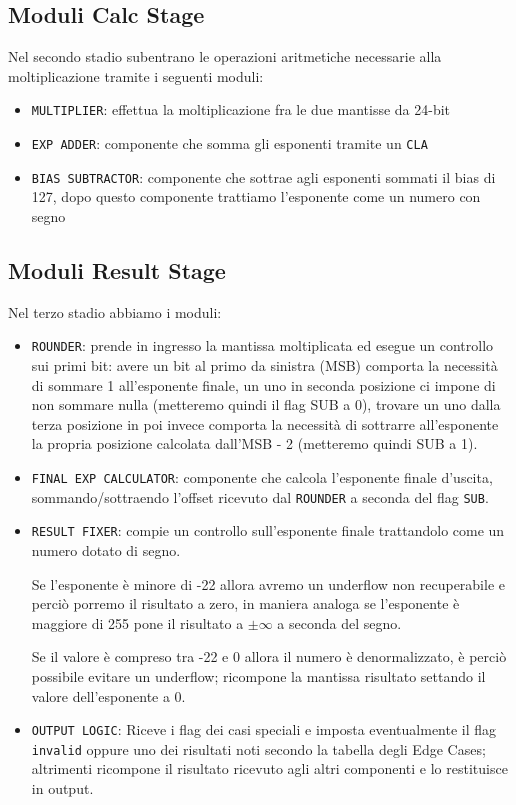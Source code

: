 \documentclass[twoside,11pt]{article}
\begin{document}
{\subsection{Moduli Calc Stage}
Nel secondo stadio subentrano le operazioni aritmetiche necessarie alla moltiplicazione tramite i seguenti moduli:
\begin{itemize}[noitemsep]
    \item \verb|MULTIPLIER|: effettua la moltiplicazione fra le due mantisse da 24-bit
    \item \verb|EXP ADDER|: componente che somma gli esponenti tramite un \verb|CLA|
    \item \verb|BIAS SUBTRACTOR|: componente che sottrae agli esponenti sommati il bias di 127, dopo questo componente trattiamo l’esponente come un numero con segno
\end{itemize}

\subsection{Moduli Result Stage}
Nel terzo stadio abbiamo i moduli:
\begin{itemize}[noitemsep]
    \item \verb|ROUNDER|: prende in ingresso la mantissa moltiplicata ed esegue un controllo sui primi bit: avere un bit al primo da sinistra (MSB) comporta la necessità di sommare 1 all'esponente finale, un uno in seconda posizione ci impone di non sommare nulla (metteremo quindi il flag SUB a 0), trovare un uno dalla terza posizione in poi invece comporta la necessità di sottrarre all'esponente la propria posizione calcolata dall'MSB - 2 (metteremo quindi SUB a 1).
    \item \verb|FINAL EXP CALCULATOR|: componente che calcola l'esponente finale d’uscita, sommando/sottraendo l’offset ricevuto dal \verb|ROUNDER| a seconda del flag \verb|SUB|.
    \item \verb|RESULT FIXER|: compie un controllo sull’esponente finale trattandolo come un numero dotato di segno.

          Se l’esponente è minore di -22 allora avremo un underflow non recuperabile e perciò porremo il risultato a zero, in maniera analoga se l’esponente è maggiore di 255 pone il risultato a $\pm \infty$ a seconda del segno.

          Se il valore è compreso tra -22 e 0 allora il numero è denormalizzato, è perciò possibile evitare un underflow; ricompone la mantissa risultato settando il valore dell’esponente a 0.
    \item \verb|OUTPUT LOGIC|: Riceve i flag dei casi speciali e imposta eventualmente il flag \verb|invalid| oppure uno dei risultati noti secondo la tabella degli Edge Cases; altrimenti ricompone il risultato ricevuto agli altri componenti e lo restituisce in output.
\end{itemize}

}
\end{document}
